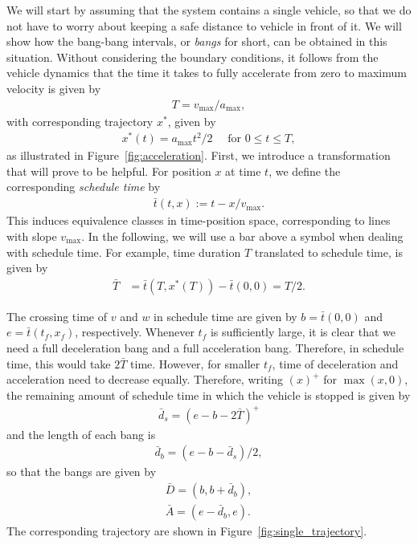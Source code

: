 \documentclass[a4paper]{article}
\theoremstyle{definition}
\theoremstyle{plain}
\begin{document}
We will start by assuming that the system contains a single vehicle, so that we
do not have to worry about keeping a safe distance to vehicle in front of it. We
will show how the bang-bang intervals, or \textit{bangs} for short, can be
obtained in this situation.
%
Without considering the boundary conditions, it follows from the vehicle
dynamics that the time it takes to fully accelerate from zero to maximum
velocity is given by
\begin{align*}
  T = v_{\max} / a_{\max} ,
\end{align*}
with corresponding trajectory $x^{*}$, given by
\begin{align*}
  x^{*}(t) = a_{\max} t^{2} / 2 \quad \text{ for }0 \leq t \leq T ,
\end{align*}
as illustrated in Figure~\ref{fig:acceleration}.
%
First, we introduce a transformation that will prove to be helpful. For position
$x$ at time $t$, we define the corresponding \textit{schedule time} by
\begin{align*}
  \bar{t}(t, x) := t - x / v_{\max} .
\end{align*}
This induces equivalence classes in time-position space, corresponding to lines
with slope $v_{\max}$. In the following, we will use a bar above a symbol when
dealing with schedule time.
%
For example, time duration $T$ translated to schedule time, is given by
\begin{align*}
  \bar{T} &= \bar{t}(T, x^{*}(T)) - \bar{t}(0, 0) = T / 2 .
\end{align*}

The crossing time of $v$ and $w$ in schedule time are given by $b = \bar{t}(0, 0)$
and $e = \bar{t}(t_{f}, x_{f})$, respectively.
%
Whenever $t_{f}$ is sufficiently large, it is clear that we need a full
deceleration bang and a full acceleration bang. Therefore, in schedule time,
this would take $2 \bar{T}$ time.
%
However, for smaller $t_{f}$, time of deceleration and acceleration need to
decrease equally. Therefore, writing $(x)^{+}$ for $\max(x, 0)$, the remaining
amount of schedule time in which the vehicle is stopped is given by
\begin{align*}
  \bar{d}_{s} = {(e - b - 2\bar{T})}^{+}
\end{align*}
and the length of each bang is
\begin{align*}
  \bar{d}_{b} = (e - b - \bar{d}_{s}) / 2 ,
\end{align*}
so that the bangs are given by
\begin{align*}
  \bar{D} = (b, b + \bar{d}_{b}) , \\
  \bar{A} = (e - \bar{d}_{b}, e) .
\end{align*}
The corresponding trajectory are shown in Figure~\ref{fig:single_trajectory}.
\end{document}
